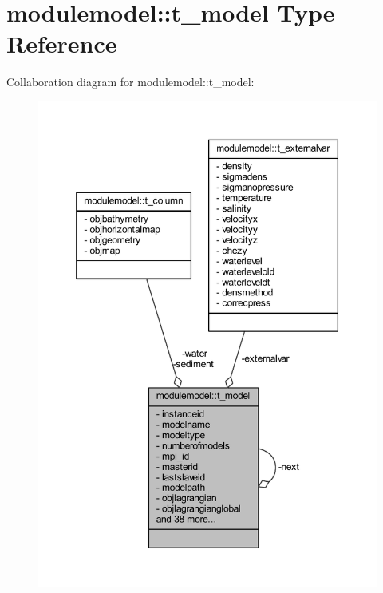 \hypertarget{structmodulemodel_1_1t__model}{}\section{modulemodel\+:\+:t\+\_\+model Type Reference}
\label{structmodulemodel_1_1t__model}


Collaboration diagram for modulemodel\+:\+:t\+\_\+model\+:
\nopagebreak
\begin{figure}[H]
\begin{center}
\leavevmode
\includegraphics[width=350pt]{structmodulemodel_1_1t__model__coll__graph}
\end{center}
\end{figure}
